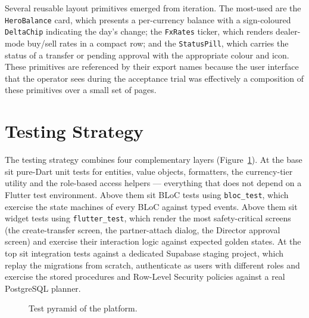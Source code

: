 Several reusable layout primitives emerged from iteration. The most-used are the \texttt{HeroBalance} card, which presents a per-currency balance with a sign-coloured \texttt{DeltaChip} indicating the day's change; the \texttt{FxRates} ticker, which renders dealer-mode buy/sell rates in a compact row; and the \texttt{StatusPill}, which carries the status of a transfer or pending approval with the appropriate colour and icon. These primitives are referenced by their export names because the user interface that the operator sees during the acceptance trial was effectively a composition of these primitives over a small set of pages.

\section{Testing Strategy}
\label{sec:testing}

The testing strategy combines four complementary layers (Figure~\ref{fig:testpyramid}). At the base sit pure-Dart unit tests for entities, value objects, formatters, the currency-tier utility and the role-based access helpers --- everything that does not depend on a Flutter test environment. Above them sit BLoC tests using \texttt{bloc\_test}, which exercise the state machines of every BLoC against typed events. Above them sit widget tests using \texttt{flutter\_test}, which render the most safety-critical screens (the create-transfer screen, the partner-attach dialog, the Director approval screen) and exercise their interaction logic against expected golden states. At the top sit integration tests against a dedicated Supabase staging project, which replay the migrations from scratch, authenticate as users with different roles and exercise the stored procedures and Row-Level Security policies against a real PostgreSQL planner.

\begin{figure}[h]
  \centering
  \caption{Test pyramid of the platform.}
  \label{fig:testpyramid}
\end{figure}

